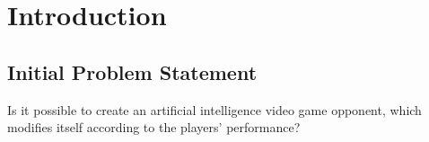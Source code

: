 \section{Introduction} \label{sec:introduction}

\subsection{Initial Problem Statement} \label{sec:initialproblemstatement}
Is it possible to create an artificial intelligence video game opponent, which modifies itself according to the players' performance?
